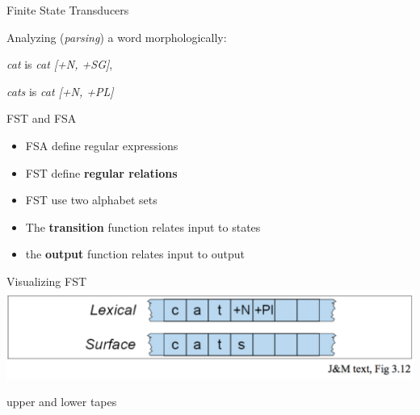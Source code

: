\documentclass{beamer}
\def\dx{1cm} \def\dy{1.5cm}
\newcommand{\newState}[4]{\node[state,#3](#1)[#4]{#2};}
\newcommand{\newTransition}[4]{\path[->] (#1) edge [#4] node {#3} (#2);}
\begin{document}
\begin{frame}{Finite State Transducers}

  Analyzing ({\it parsing}) a word morphologically:
  
  {\it cat} is {\it cat [+N, +SG]},
  
  {\it cats} is {\it cat [+N, +PL]}

  \vspace{0.5cm}

  \centering
\end{frame}

\begin{frame}{FST and FSA}
  \begin{itemize}
  \item FSA define regular expressions
  \item FST define {\bf regular relations}
  \item FST use two alphabet sets
  \item The {\bf transition} function relates input to states
  \item the {\bf output} function relates input to output
  \end{itemize}
\end{frame}

\begin{frame}{Visualizing FST}
  \includegraphics[width=\textwidth]{figures/cats}

  upper and lower tapes
\end{frame}
\end{document}
